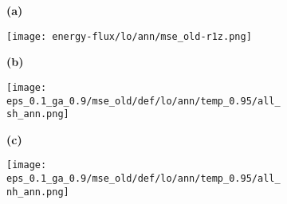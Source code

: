 \documentclass[preview]{standalone}
\begin{document}
\begin{figure}
  \begin{subfigure}[t]{0.05\textwidth}
    \textbf{\large{(a)}}
  \end{subfigure}
  \begin{subfigure}[t]{0.95\textwidth}
    \texttt{[image: energy-flux/lo/ann/mse\_old-r1z.png]}
  \end{subfigure}

  \begin{subfigure}[t]{0.05\textwidth}
    \textbf{\large{(b)}}
  \end{subfigure}
  \begin{subfigure}[t]{0.45\textwidth}
    \texttt{[image: eps\_0.1\_ga\_0.9/mse\_old/def/lo/ann/temp\_0.95/all\_sh\_ann.png]}
  \end{subfigure}
  \begin{subfigure}[t]{0.05\textwidth}
    \textbf{\large{(c)}}
  \end{subfigure}
  \begin{subfigure}[t]{0.45\textwidth}
    \texttt{[image: eps\_0.1\_ga\_0.9/mse\_old/def/lo/ann/temp\_0.95/all\_nh\_ann.png]}
  \end{subfigure}

\end{figure}
\end{document}
